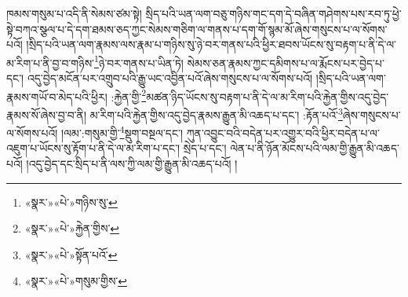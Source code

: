 ཁམས་གསུམ་པ་འདི་ནི་སེམས་ཙམ་སྟེ། སྲིད་པའི་ཡན་ལག་བཅུ་གཉིས་གང་དག་དེ་བཞིན་གཤེགས་པས་རབ་ཏུ་ཕྱེ་སྟེ་བཀའ་སྩལ་པ་དེ་དག་ཐམས་ཅད་ཀྱང་སེམས་གཅིག་ལ་གནས་པ་དག་གོ་སྙམ་མོ་ཞེས་གསུངས་པ་ལ་སོགས་པའོ། །སྲིད་པའི་ཡན་ལག་རྣམས་ལས་རྣམ་པ་གཉིས་སུ་ཉེ་བར་གནས་པའི་ཕྱིར་ཐབས་ཡོངས་སུ་བརྟག་པ་ནི་དེ་ལ་མ་རིག་པ་ནི་བྱ་བ་གཉིས་\footnote{«སྣར་»«པེ་»གཉིས་སུ་}ཉེ་བར་གནས་པ་ཡིན་ཏེ། སེམས་ཅན་རྣམས་ཀྱང་དམིགས་པ་ལ་རྨོངས་པར་བྱེད་པ་དང་། འདུ་བྱེད་མངོན་པར་འགྲུབ་པའི་རྒྱུ་ཡང་འབྱིན་པའོ་ཞེས་གསུངས་པ་ལ་སོགས་པའོ། །སྲིད་པའི་ཡན་ལག་རྣམས་གཡོ་བ་མེད་པའི་ཕྱིར། :རྐྱེན་གྱི་\footnote{«སྣར་»«པེ་»རྐྱེན་གྱིས་}མཚན་ཉིད་ཡོངས་སུ་བརྟག་པ་ནི་དེ་ལ་མ་རིག་པའི་རྐྱེན་གྱིས་འདུ་བྱེད་རྣམས་སོ་ཞེས་བྱ་བ་ནི། མ་རིག་པའི་རྐྱེན་གྱིས་འདུ་བྱེད་རྣམས་རྒྱུན་མི་འཆད་པ་དང་། :རྟོན་པའོ་\footnote{«སྣར་»«པེ་»སྟོན་པའོ་}ཞེས་གསུངས་པ་ལ་སོགས་པའོ། །ལམ་:གསུམ་གྱི་\footnote{«སྣར་»«པེ་»གསུམ་གྱིས་}སྡུག་བསྔལ་དང་། ཀུན་འབྱུང་བའི་བདེན་པར་འགྱུར་བའི་ཕྱིར་བདེན་པ་ལ་འཇུག་པ་ཡོངས་སུ་རྟོག་པ་ནི་དེ་ལ་མ་རིག་པ་དང་། སྲེད་པ་དང་། ལེན་པ་ནི་ཉོན་མོངས་པའི་ལམ་གྱི་རྒྱུན་མི་འཆད་པའོ། །འདུ་བྱེད་དང་སྲིད་པ་ནི་ལས་ཀྱི་ལམ་གྱི་རྒྱུན་མི་འཆད་པའོ། །
